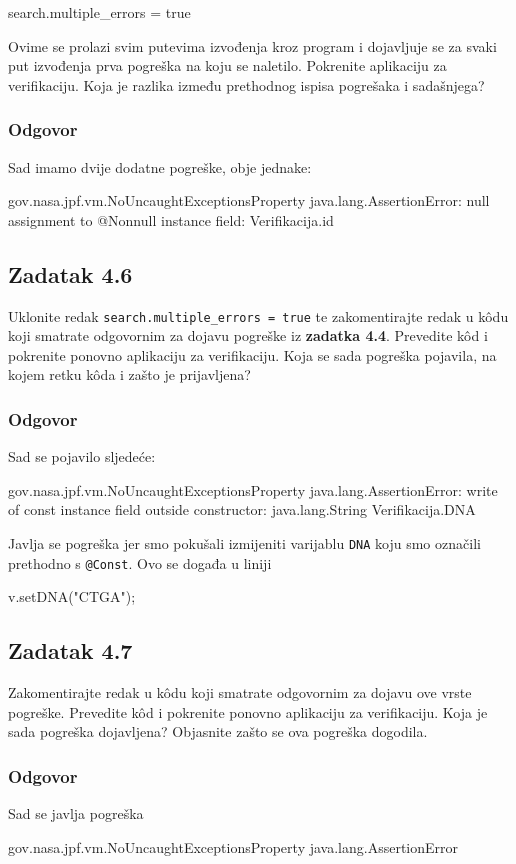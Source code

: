 \documentclass{article}
\newcommand{\zadatak}[1]{\subsection{Zadatak #1}}
\newcommand{\odgovor}{\subsubsection*{Odgovor}}
\newcommand{\code}[1]{\colorbox{blue!11}{\texttt{#1}}}
\begin{document}
\begin{ccode}
search.multiple_errors = true
\end{ccode}

\noindent
Ovime se prolazi svim putevima izvođenja kroz program i dojavljuje se za svaki put izvođenja prva pogreška na koju se naletilo. Pokrenite aplikaciju za verifikaciju. Koja je razlika između prethodnog ispisa pogrešaka i sadašnjega?

\odgovor

Sad imamo dvije dodatne pogreške, obje jednake:

\begin{ccode}
gov.nasa.jpf.vm.NoUncaughtExceptionsProperty
java.lang.AssertionError: null assignment to @Nonnull instance field: Verifikacija.id
\end{ccode}

\zadatak{4.6}

Uklonite redak \code{search.multiple\_errors = true} te zakomentirajte redak u kôdu koji smatrate odgovornim za dojavu pogreške iz \textbf{zadatka 4.4}. Prevedite kôd i pokrenite ponovno aplikaciju za verifikaciju. Koja se sada pogreška pojavila, na kojem retku kôda i zašto je prijavljena?

\odgovor

Sad se pojavilo sljedeće:

\begin{ccode}
gov.nasa.jpf.vm.NoUncaughtExceptionsProperty
java.lang.AssertionError: write of const instance field outside constructor: java.lang.String Verifikacija.DNA
\end{ccode}

\noindent
Javlja se pogreška jer smo pokušali izmijeniti varijablu \texttt{DNA} koju smo označili prethodno s \code{@Const}. Ovo se događa u liniji

\begin{ccode}
v.setDNA("CTGA");
\end{ccode}

\pagebreak  %

\zadatak{4.7}

Zakomentirajte redak u kôdu koji smatrate odgovornim za dojavu ove vrste pogreške. Prevedite kôd i pokrenite ponovno aplikaciju za verifikaciju. Koja je sada pogreška dojavljena? Objasnite zašto se ova pogreška dogodila.

\odgovor

Sad se javlja pogreška

\begin{ccode}
gov.nasa.jpf.vm.NoUncaughtExceptionsProperty
java.lang.AssertionError
\end{ccode}
\end{document}
